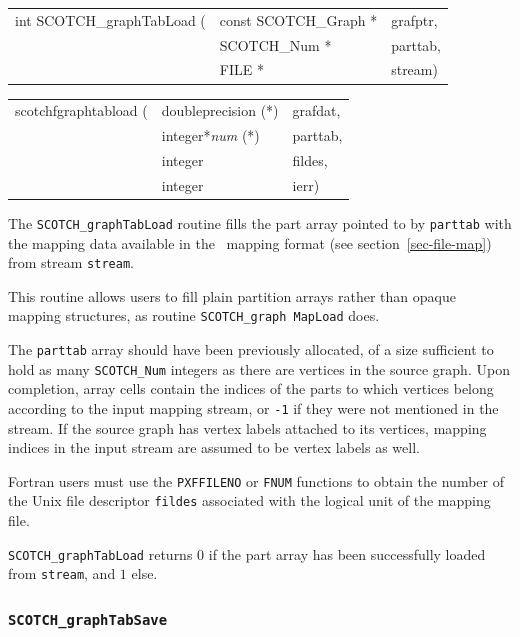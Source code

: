 \begin{itemize}
\progsyn

{\tt\begin{tabular}{l@{}ll}
int SCOTCH\_graphTabLoad ( & const SCOTCH\_Graph * & grafptr, \\
                           & SCOTCH\_Num *         & parttab, \\
                           & FILE *                & stream)
\end{tabular}}

{\tt\begin{tabular}{l@{}ll}
scotchfgraphtabload ( & doubleprecision (*)   & grafdat, \\
                      & integer*{\it num} (*) & parttab, \\
                      & integer               & fildes,  \\
                      & integer               & ierr)
\end{tabular}}

\progdes

The {\tt SCOTCH\_graphTabLoad} routine fills the part array pointed to
by {\tt parttab} with the mapping data available in the
\scotch\ mapping format (see section~\ref{sec-file-map})
from stream {\tt stream}.

This routine allows users to fill plain partition arrays rather than
opaque mapping structures, as routine {\tt SCOTCH\_\lbt graph\lbt
Map\lbt Load} does.

The {\tt parttab} array should have been previously allocated, of a
size sufficient to hold as many {\tt SCOTCH\_\lbt Num} integers as
there are vertices in the source graph. Upon completion, array cells
contain the indices of the parts to which vertices belong according to
the input mapping stream, or {\tt -1} if they were not mentioned in
the stream. If the source graph has vertex labels attached to its
vertices, mapping indices in the input stream are assumed to be vertex
labels as well.

Fortran users must use the {\tt PXFFILENO} or {\tt FNUM} functions to
obtain the number of the Unix file descriptor {\tt fildes} associated
with the logical unit of the mapping file.

\progret

{\tt SCOTCH\_graphTabLoad} returns $0$ if the part array
has been successfully loaded from {\tt stream}, and $1$ else.
\end{itemize}

\subsubsection{{\tt SCOTCH\_graphTabSave}}
\label{sec-lib-graph-tab-load}

